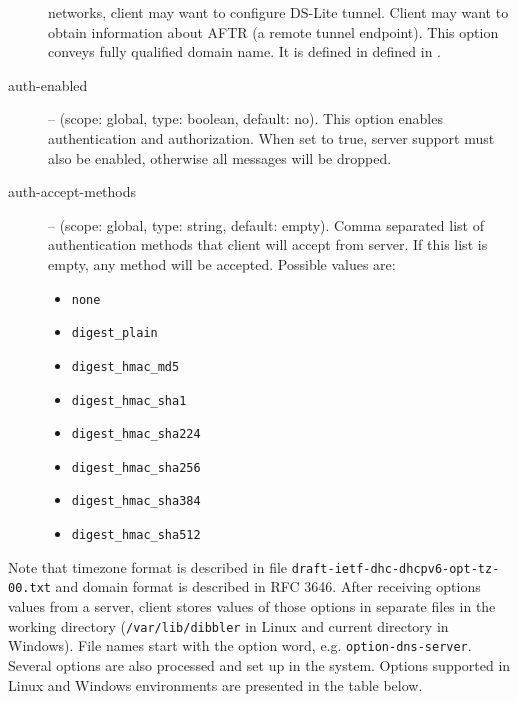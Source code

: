 \begin{description}
   networks, client may want to configure DS-Lite tunnel. Client may
   want to obtain information about AFTR (a remote tunnel
   endpoint). This option conveys fully qualified domain name. It is
   defined in defined in \cite{rfc6334}.
 \item[auth-enabled] -- (scope: global, type: boolean, default:
   no). This option enables authentication and authorization. When set
   to true, server support must also be enabled, otherwise all
   messages will be dropped.
 \item[auth-accept-methods] -- (scope: global, type: string, default:
   empty).  Comma separated list of authentication methods that client
   will accept from server. If this list is empty, any method will be
   accepted. Possible values are:
   \begin{itemize}
   \item \texttt{none}
   \item \texttt{digest\_plain}
   \item \texttt{digest\_hmac\_md5}
   \item \texttt{digest\_hmac\_sha1}
   \item \texttt{digest\_hmac\_sha224}
   \item \texttt{digest\_hmac\_sha256}
   \item \texttt{digest\_hmac\_sha384}
   \item \texttt{digest\_hmac\_sha512}
   \end{itemize}
\end{description}

Note that timezone format is described in file \verb+draft-ietf-dhc-dhcpv6-opt-tz-00.txt+
and domain format is described in RFC 3646. After receiving options
values from a server, client stores values of those options in separate
files in the working directory (\verb+/var/lib/dibbler+ in Linux and
current directory in Windows). File names start with the option word,
e.g. \verb+option-dns-server+. Several options are also processed and
set up in the system. Options supported in Linux and Windows
environments are presented in the table below.


